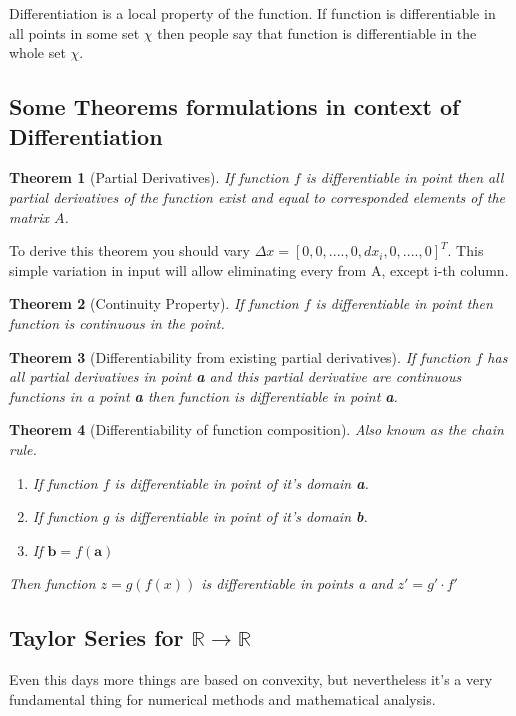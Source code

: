 \documentclass[12pt,a4paper]{article}
\theoremstyle{plain}
\newtheorem{theorem}{Theorem}[section]
\begin{document}
Differentiation is a local property of the function. If function is differentiable in all points in some set $\chi$ then people say that function is differentiable in the whole set $\chi$.
\\
\subsection{Some Theorems formulations in context of Differentiation}
\begin{theorem} [Partial Derivatives]
 If function $f$ is differentiable in point then all partial derivatives of the function exist and equal to corresponded elements of the matrix $A$.
\end{theorem}
To derive this theorem you should vary \textbf{$\varDelta x = [0, 0, ...., 0, dx_i, 0, ...., 0]^T$}.
This simple variation in input will allow eliminating every from A, except i-th column.

\begin{theorem} [Continuity Property]
 If function $f$ is differentiable in point then function is continuous in the point.
\end{theorem}
\begin{theorem} [Differentiability from existing partial derivatives]
 If function $f$ has all partial derivatives in point \textbf{a} and this partial derivative are continuous functions in a point \textbf{a} then function is differentiable in point \textbf{a}.
\end{theorem}
\begin{theorem} [Differentiability of function composition] Also known as the chain rule.
 \begin{enumerate}
  \item  If function $f$ is differentiable in point of it's domain \textbf{a}.
  \item  If function $g$ is differentiable in point of it's domain \textbf{b}.
  \item  If $\textbf{b} = f(\textbf{a})$
 \end{enumerate}
 Then function $z=g(f(x))$ is differentiable in points \textit{a} and 
 $z' = g' \cdot f'$
\end{theorem}

\subsection{Taylor Series for $\mathbb{R} \to \mathbb{R}$}

Even this days more things are based on convexity, but nevertheless it's a very fundamental thing for numerical methods and mathematical analysis. 
\end{document}
